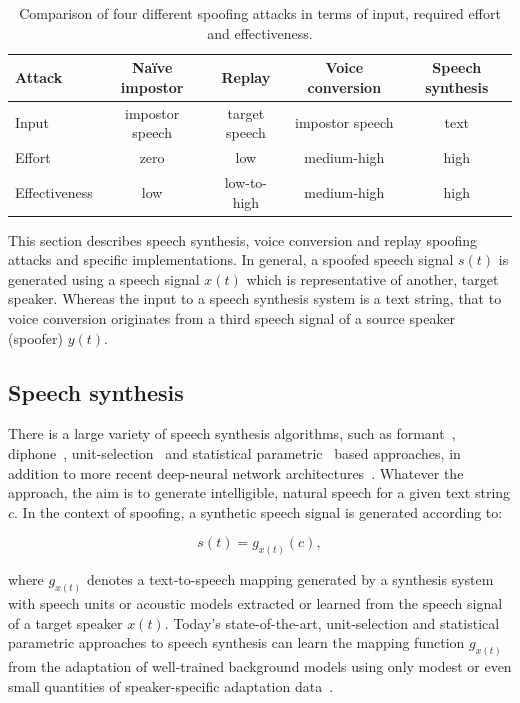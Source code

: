 \begin{table}[!ht]
\renewcommand{\arraystretch}{1.3}
\begin{center}
    \begin{tabular}{ l | c c c c }
    \hline
     	 Attack & Na\"{i}ve impostor &  Replay & Voice conversion & Speech synthesis\\ 
    \hline
Input         & impostor speech  & target speech & impostor speech & text\\
Effort        & zero & low & medium-high & high\\
Effectiveness & low &  low-to-high & medium-high & high\\
 \hline
\hline
    \end{tabular}
    \caption{Comparison of four different spoofing attacks in terms of input, required effort and effectiveness.}
		\label{tab::attacks}
   \end{center}
\end{table}

This section describes speech synthesis, voice conversion and replay spoofing attacks and specific implementations.  In general, a spoofed speech signal $s(t)$ is generated using a speech signal $x(t)$ which is representative of another, target speaker.  Whereas the input to a speech synthesis system is a text string, that to voice conversion originates from a third speech signal of a source speaker (spoofer) $y(t)$.  



\subsection{Speech synthesis}
\label{ssec:spsyn}

There is a large variety of speech synthesis algorithms, such as formant~\cite{Klatt1980}, diphone~\cite{Moulines1990}, unit-selection~\cite{Hunt1996} and statistical parametric~\cite{Tokuda2000} based approaches, in addition to more recent deep-neural network architectures~\cite{Zen2013}.  Whatever the approach, the aim is to generate intelligible, natural speech for a given text string $c$. In the context of spoofing, a synthetic speech signal is generated according to:

\begin{equation}
s(t) = g_{x(t)}(c),
\label{eq:tts}
\end{equation}

\noindent where $g_{x(t)}$ denotes a text-to-speech mapping generated by a synthesis system with speech units or acoustic models extracted or learned from the speech signal of a target speaker $x(t)$.  Today's state-of-the-art, unit-selection and statistical parametric approaches to speech synthesis can learn the mapping function $g_{x(t)}$ from the adaptation of well-trained background models using only modest or even small quantities of speaker-specific adaptation data~\cite{Zen2007a}.  

